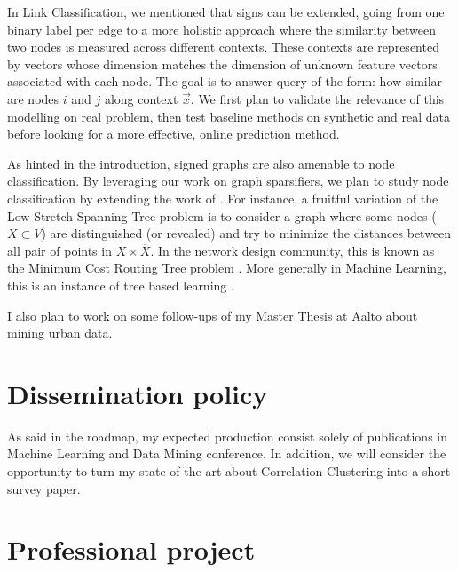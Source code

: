In Link Classification, we mentioned that signs can be extended, going from one
binary label per edge to a more holistic approach where the similarity between
two nodes is measured across different contexts. These contexts are represented
by vectors whose dimension matches the dimension of unknown feature vectors
associated with each node. The goal is to answer query of the form: how similar
are nodes $i$ and $j$ along context $\vec{x}$. We first plan to validate the
relevance of this modelling on real problem, then test baseline methods on
synthetic and real data before looking for a more effective, online prediction
method.

\iffalse
In Link Classification, an intriguing direction in the batch supervised setting
would be to generate features using deep learning architecture
\autocites{Perozzi2014}{Yanardag2015}.
\fi

As hinted in the introduction, signed graphs are also amenable to node
classification. By leveraging our work on graph sparsifiers, we plan
to study node classification by extending the work of \textcite{Vitale2012}.
For instance, a fruitful variation of the Low Stretch Spanning Tree problem is
to consider a graph where some nodes ($X \subset V$) are distinguished (or
revealed) and try to minimize the distances between all pair of points in $X
\times \overline{X}$. In the network design community, this is known as the
Minimum Cost Routing Tree problem \autocites{Johnson1978}{Connamacher2003}.
More generally in Machine Learning, this is an instance of tree based learning
\autocite{cesa2009fast}.

I also plan to work on some follow-ups of my Master Thesis at Aalto
about mining urban data.

\section{Dissemination policy}\label{dissemination-policy}


As said in the roadmap, my expected production consist solely of publications
in Machine Learning and Data Mining conference. In addition, we will consider
the opportunity to turn my state of the art about Correlation Clustering into a
short survey paper.

\section{Professional project}\label{professional-project}

